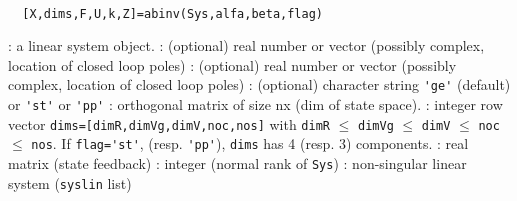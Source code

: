 \begin{mandesc}
   \\ %
\end{mandesc}
\begin{calling_sequence}
\begin{verbatim}
  [X,dims,F,U,k,Z]=abinv(Sys,alfa,beta,flag)  
\end{verbatim}
\end{calling_sequence}
\begin{parameters}
  \begin{varlist}
    :  a linear system object.
    : (optional) real number or vector (possibly complex, location of closed loop poles)
    : (optional) real number or vector (possibly complex, location of closed loop poles)
    : (optional) character string \verb!'ge'! (default) or \verb!'st'! or \verb!'pp'!
    : orthogonal matrix of size nx (dim of state space).
    : integer row vector \verb!dims=[dimR,dimVg,dimV,noc,nos]! with 
    \verb!dimR! $\le$ \verb!dimVg! $\le$ \verb!dimV! $\le$ \verb!noc! $\le$ \verb!nos!. 
    If \verb!flag='st'!, (resp. \verb!'pp'!), \verb!dims! has 4 (resp. 3) components.
    : real matrix (state feedback)
    : integer (normal rank of \verb!Sys!)
    : non-singular linear system (\verb!syslin! list)
  \end{varlist}
\end{parameters}

